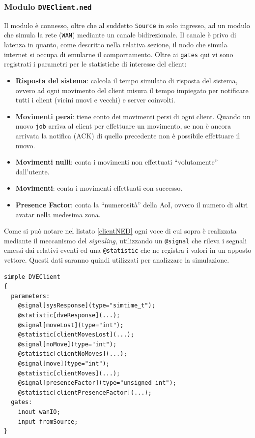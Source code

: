 \documentclass[a4paper, 11pt, oneside]{book}
\newcommand{\files}[1]{\texttt{#1}}
\theoremstyle{definition}
\theoremstyle{remark}
\begin{document}
\subsubsection{Modulo \files{DVEClient.ned}}
Il modulo è connesso, oltre che al suddetto \texttt{Source} in solo ingresso,
ad un modulo che simula la rete (\texttt{WAN}) mediante un canale bidirezionale.
Il canale è privo di latenza in quanto, come descritto nella relativa sezione,
il nodo che simula internet si occupa di emularne il comportamento.
Oltre ai \texttt{gates} qui vi sono registrati i parametri per le statistiche
di interesse del client:
\begin{itemize}
\item \textbf{Risposta del sistema}: calcola il tempo simulato di risposta
del sistema, ovvero ad ogni movimento del client misura il tempo impiegato
per notificare tutti i client (vicini nuovi e vecchi) e server coinvolti.
\item \textbf{Movimenti persi}: tiene conto dei movimenti persi di ogni client.
Quando un nuovo \texttt{job} arriva al client per effettuare un movimento, se
non è ancora arrivata la notifica (ACK) di quello precedente non è possibile
effettuare il nuovo.
\item \textbf{Movimenti nulli}: conta i movimenti non effettuati ``volutamente''
dall'utente.
\item \textbf{Movimenti}: conta i movimenti effettuati con successo.
\item \textbf{Presence Factor}: conta la ``numerosità'' della AoI, ovvero
il numero di altri avatar nella medesima zona.
\end{itemize}
Come si può notare nel listato \ref{clientNED} ogni voce di cui sopra è
realizzata mediante il meccanismo del \emph{signaling}, utilizzando un
\texttt{@signal} che rileva i segnali emessi dai relativi eventi
ed una \texttt{@statistic} che ne registra i valori in un apposto vettore.
Questi dati saranno quindi utilizzati per analizzare la simulazione.

\begin{lstlisting}[caption = {Il Modulo DVEClient.},
                   label = {clientNED}]
simple DVEClient
{
  parameters:
    @signal[sysResponse](type="simtime_t");
    @statistic[dveResponse](...);
    @signal[moveLost](type="int");
    @statistic[clientMovesLost](...);
    @signal[noMove](type="int");
    @statistic[clientNoMoves](...);
    @signal[move](type="int");
    @statistic[clientMoves](...);
    @signal[presenceFactor](type="unsigned int");
    @statistic[clientPresenceFactor](...);
  gates:
    inout wanIO;
    input fromSource;
}
\end{lstlisting}
\end{document}
